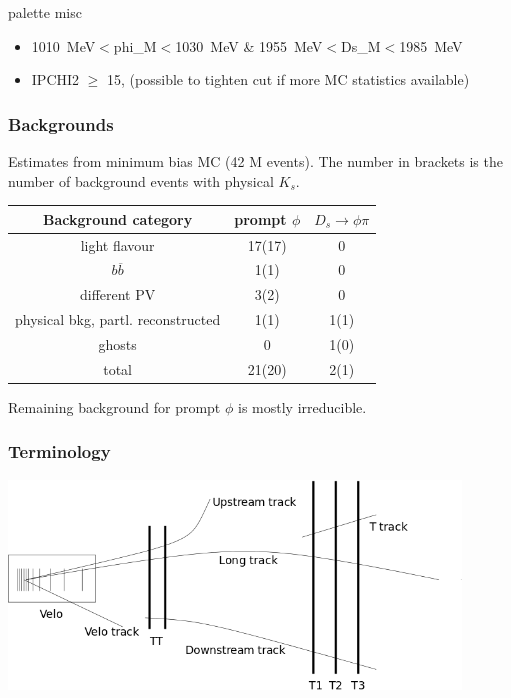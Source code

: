 \documentclass{beamer}
\newcommand{\backupend}{
   \addtocounter{framenumbervorappendix}{-\value{framenumber}}
   \addtocounter{framenumber}{\value{framenumbervorappendix}} 
 }
\begin{document}
\begin{frame}[fragile]
\begin{beamercolorbox}[rounded=true,shadow=true]{palette misc}
\begin{itemize}
\begin{columns}
\begin{column}{.48\textwidth}
\end{column}
\end{columns}

\item \SI{1010}{MeV}$<$phi_M$<$\SI{1030}{MeV} \& \SI{1955}{MeV}$<$Ds_M$<$\SI{1985}{MeV}
\item IPCHI2 $\geq$ 15,\small{ (possible to tighten cut if more MC statistics available)}
\end{itemize}
\end{beamercolorbox}




\end{frame}


\begin{frame}[fragile]
\frametitle{Backgrounds}
Estimates from minimum bias MC (42 M events). The number in brackets is the number of background events with physical $K_s$.
\begin{center}
\begin{tabular}{c|c|c}
Background category & prompt $\phi$ & $D_s \rightarrow \phi \pi$ \\ 
\hline 
light flavour & 17(17) & 0 \\ 
$b\overline{b}$ & 1(1) & 0 \\ 
different PV & 3(2) & 0 \\ 
physical bkg, partl. reconstructed & 1(1) & 1(1) \\ 
ghosts & 0 & 1(0) \\ 
\hline 
total & 21(20) & 2(1) \\  
\end{tabular} 
\end{center}
Remaining background for prompt $\phi$ is mostly irreducible.

\end{frame}

\begin{frame}[fragile]
\frametitle{Terminology}

\begin{center}
\includegraphics[width = 0.9\textwidth]{tracktypes.png}
\end{center}
\end{frame}



\backupend
\end{document}
